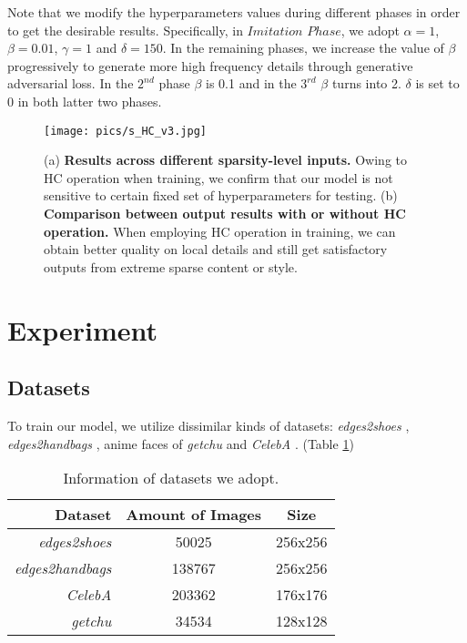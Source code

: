 \documentclass[10pt,twocolumn,letterpaper]{article} \usepackage{amsfonts,amssymb}
\begin{document}
Note that we modify the hyperparameters values during different phases in order to get the desirable results. Specifically, in $Imitation$ $Phase$, we adopt $\alpha =1$, $\beta =0.01$, $\gamma = 1$ and $\delta = 150$. In the remaining phases, we increase the value of $\beta$ progressively to generate more high frequency details through generative adversarial loss. In the $2^{nd}$ phase $\beta$ is 0.1 and in the $3^{rd}$ $\beta$ turns into 2. $\delta$ is set to 0 in both latter two phases.


\begin{figure*}[t]
\centering



\texttt{[image: pics/s\_HC\_v3.jpg]}

\caption{(a) \textbf{Results across different sparsity-level inputs.} Owing to HC operation when training, we confirm that our model is not sensitive to certain fixed set of hyperparameters for testing. (b) \textbf{Comparison between output results with or without HC operation.} When employing HC operation in training, we can obtain better quality on local details and still get satisfactory outputs from extreme sparse content or style.}
\label{Experiment.2}
\end{figure*}


\section{Experiment}
\subsection{Datasets} \label{Datasets}
To train our model, we utilize dissimilar kinds of datasets: \emph{edges2shoes} \cite{isola2017image}, \emph{edges2handbags} \cite{isola2017image}, anime faces of \emph{getchu} \cite{jin2017towards} and \emph{CelebA} \cite{liu2015deep}. (Table \ref{dataset})

\begin{table}[ht]
\begin{tabular}{rcc}
\toprule
\multicolumn{1}{r}{Dataset} & Amount of Images & Size \\
\midrule
\textit{edges2shoes} & 50025 & 256x256 \\
\textit{edges2handbags} & 138767 & 256x256 \\
\textit{CelebA} & 203362 & 176x176 \\
\textit{getchu} & 34534 & 128x128 \\
\bottomrule
\end{tabular}
\caption{Information of datasets we adopt.}
\label{dataset}
\end{table}
\end{document}

